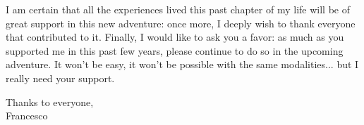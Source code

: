 I am certain that all the experiences lived this past chapter of my life will be of great support in this new adventure: once more, I deeply wish to thank everyone that contributed to it.
Finally, I would like to ask you a favor: as much as you supported me in this past few years, please continue to do so in the upcoming adventure.
It won't be easy, it won't be possible with the same modalities... but I really need your support.\ackspace

Thanks to everyone, \\
\null\hfill Francesco
